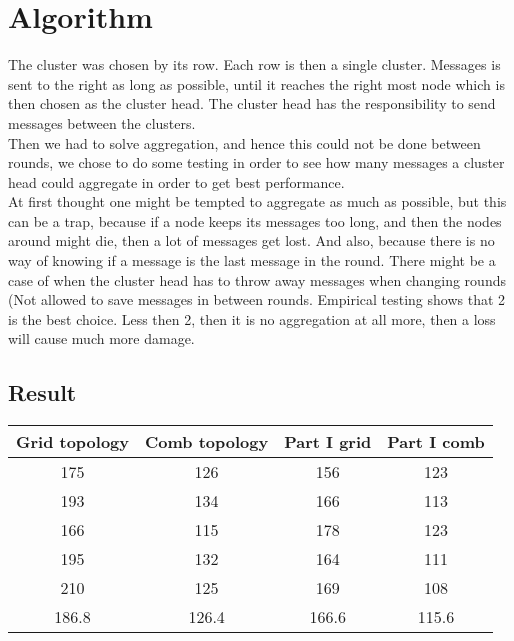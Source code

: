 \documentclass{article}
\begin{document}
  \section{Algorithm}
   The cluster was chosen by its row. Each row is then a single cluster. Messages
   is sent to the right as long as possible, until it reaches the right most
   node which is then chosen as the cluster head. The cluster head has the
   responsibility to send messages between the clusters.\\
   Then we had to solve aggregation, and hence this could not be done between
   rounds, we chose to do some testing in order to see how many messages a cluster
   head could aggregate in order to get best performance.\\
   At first thought one might be tempted to aggregate as much as possible, but
   this can be a trap, because if a node keeps its messages too long, and then
   the nodes around might die, then a lot of messages get lost. And also, because
   there is no way of knowing if a message is the last message in the round. There might be
   a case of when the cluster head has to throw away messages when changing
   rounds (Not allowed to save messages in between rounds. Empirical testing
   shows that 2 is the best choice. Less then 2, then it is no aggregation at all
   more, then a loss will cause much more damage. 

  \subsection{Result}
    \begin{tabular}{c|c||c|c}
      Grid topology & Comb topology & Part I grid & Part I comb\\
      \hline
      \hline
      175 &126  &156 & 123 \\
      193 &134  &166 & 113 \\
      166 &115  &178 & 123 \\
      195 &132  &164 & 111 \\
      210 &125  &169 & 108 \\
      \hline
      186.8&126.4&166.6&115.6\\
    \end{tabular}
\end{document}
